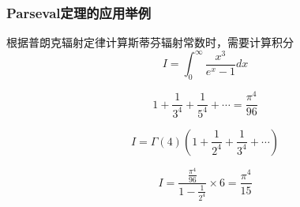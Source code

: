 \documentclass[10pt]{beamer}
\begin{document}
  \begin{frame}[allowframebreaks]
  \frametitle{Parseval定理的应用举例}
  
  根据普朗克辐射定律计算斯蒂芬辐射常数时，需要计算积分
  \begin{equation}
  I=\int_{0}^{\infty} \frac{x^{3}}{e^{x}-1} d x
  \end{equation}
  
  \begin{equation}
  1+\frac{1}{3^{4}}+\frac{1}{5^{4}}+\cdots=\frac{\pi^{4}}{96}
  \end{equation}
  
  \begin{equation}
  I=\Gamma(4)\left(1+\frac{1}{2^{4}}+\frac{1}{3^{4}}+\cdots\right)
  \end{equation}
  
  \begin{equation}
  I=\frac{\frac{\pi^{4}}{96}}{1-\frac{1}{2^{4}}} \times 6=\frac{\pi^{4}}{15}
  \end{equation}
  \end{frame}
\end{document}
